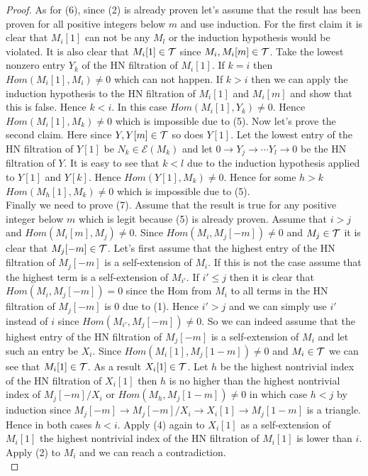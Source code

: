 \begin{proof}
\indent As for (6), since (2) is already proven let's assume that the result has been proven for all positive integers below $m$ and use induction. For the first claim it is clear that $M_i[1]$ can not be any $M_l$ or the induction hypothesis would be violated. It is also clear that $M_i[1]\in\mathcal{T}$ since $M_i, M_i[m]\in\mathcal{T}$. Take the lowest nonzero entry $Y_k$ of the HN filtration of $M_i[1]$. If $k=i$ then $Hom(M_i[1],M_i)\neq 0$ which can not happen. If $k>i$ then we can apply the induction hypothesis to the HN filtration of $M_i[1]$ and $M_i[m]$ and show that this is false. Hence $k<i$. In this case $Hom(M_i[1],Y_k)\neq 0$. Hence $Hom(M_i[1],M_k)\neq 0$ which is impossible due to (5). Now let's prove the second claim. Here since $Y,Y[m]\in\mathcal{T}$ so does $Y[1]$. Let the lowest entry of the HN filtration of $Y[1]$ be $N_k\in\mathcal{E}(M_k)$ and let $0\to Y_j\to\cdots Y_l\to 0$ be the HN filtration of $Y$. It is easy to see that $k<l$ due to the induction hypothesis applied to $Y[1]$ and $Y[k]$. Hence $Hom(Y[1],M_k)\neq 0$. Hence for some $h>k$ $Hom(M_h[1],M_k)\neq 0$ which is impossible due to (5).\\
\indent Finally we need to prove (7). Assume that the result is true for any positive integer below $m$ which is legit because (5) is already proven. Assume that $i>j$ and $Hom(M_i[m],M_j) \neq 0$. Since $Hom(M_i, M_j[-m])\neq 0$ and $M_j\in\mathcal{T}$ it is clear that $M_j[-m]\in\mathcal{T}$. Let's first assume that the highest entry of the HN filtration of $M_j[-m]$ is a self-extension of $M_i$. If this is not the case assume that the highest term is a self-extension of $M_{i'}$. If $i'\leq j$ then it is clear that $Hom(M_i,M_j[-m])=0$ since the Hom from $M_i$ to all terms in the HN filtration of $M_j[-m]$ is 0 due to (1). Hence $i'>j$ and we can simply use $i'$ instead of $i$ since $Hom(M_{i'},M_j[-m])\neq 0$. So we can indeed assume that the highest entry of the HN filtration of $M_j[-m]$ is a self-extension of $M_i$ and let such an entry be $X_i$. Since $Hom(M_i[1], M_j[1-m])\neq 0$ and $M_i\in\mathcal{T}$ we can see that $M_i[1]\in\mathcal{T}$. As a result $X_i[1]\in\mathcal{T}$. Let $h$ be the highest nontrivial index of the HN filtration of $X_i[1]$ then $h$ is no higher than the highest nontrivial index of $M_j[-m]/X_i$ or $Hom(M_h,M_j[1-m])\neq 0$ in which case $h<j$ by induction since $M_j[-m]\to M_j[-m]/X_i\to X_i[1]\to M_j[1-m]$ is a triangle. Hence in both cases $h<i$. Apply (4) again to $X_i[1]$ as a self-extension of $M_i[1]$ the highest nontrivial index of the HN filtration of $M_i[1]$ is lower than $i$. Apply (2) to $M_i$ and we can reach a contradiction.\\
\end{proof}
